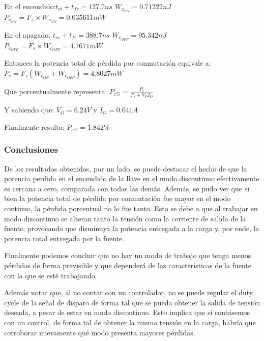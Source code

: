 \documentclass[e4_tp1_main.tex]{subfiles}
\begin{document}
	En el encendido:$t_{ri}+t_{fv}=127.7ns$ \quad $W_{c_{ON}}=0.71222nJ$\quad \quad$P_{c_{ON}}=F_s\times W_{c_{ON}}=0.035611mW$
		
	En el apagado: $t_{rv}+t_{fi}=388.7ns$ \quad\quad $W_{c_{OFF}}=95.342nJ$\quad\quad $P_{c_{OFF}}=F_s\times W_{c_{OFF}}=4.7671mW$
	
	Entonces la potencia total de pérdida por conmutación equivale a: $P_c=F_s(W_{c_{ON}}+W_{c_{OFF}})=4.8027mW$
	
	Que porcentualmente representa: $P_{c\%}=\frac{P_c}{P_c+V_OI_O}$	

	Y sabiendo que: $V_O=6.24V$ y $I_O=0.041A$
	
	Finalmente resulta: $P_{c\%}=1.842\%$
	
	\subsubsection{Conclusiones}
	De los resultados obtenidos, por un lado, se puede destacar el hecho de que la potencia perdida en el encendido de la llave en el modo discontinuo  efectivamente es cercana a cero, comparada con todas las demás. Además, se pudo ver que si bien la potencia total de pérdida por conmutación fue mayor en el modo continuo, la pérdida porcentual no lo fue tanto. Esto se debe a que al trabajar en modo discontinuo se alteran tanto la tensión como la corriente de salida de la fuente, provocando que disminuya la potencia entregada a la carga y, por ende, la potencia total entregada por la fuente. 
	
	Finalmente podemos concluir que no hay un modo de trabajo que tenga menos pérdidas de forma previsible y que dependerá de las características de la fuente con la que se esté trabajando. 
	
	Además notar que, al no contar con un controlador, no se puede regular el duty cycle de la señal de disparo de forma tal que se pueda obtener la salida de tensión deseada, a pesar de estar en modo discontinuo. Esto implica que si contásemos con un control, de forma tal de obtener la misma tensión en la carga, habría que corroborar nuevamente qué modo presenta mayores pérdidas.
	
\end{document}
